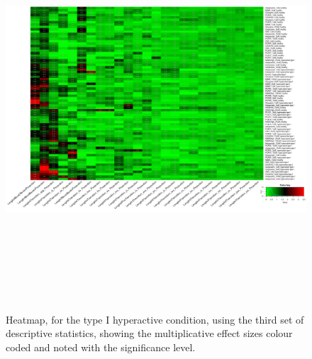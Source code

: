 \documentclass[a4paper,12pt]{article}
\begin{document}
\begin{figure}[h!]
\begin{center}
\includegraphics[width=16cm,height=15cm]{DarkApoHigh_heatmap_all_DarkApoHigh_B1MAP.png}
\caption{Heatmap, for the type I hyperactive condition, using the third set of descriptive statistics, showing the multiplicative effect sizes colour coded and noted with the significance level.}
\end{center}
\end{figure}
\newpage
\end{document}
